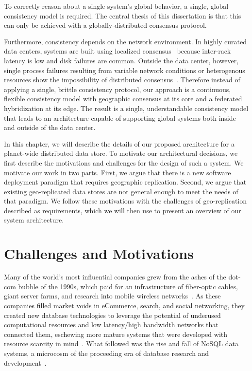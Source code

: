 To correctly reason about a single system's global behavior, a single, global consistency model is required.
The central thesis of this dissertation is that this can only be achieved with a globally-distributed consensus protocol.

Furthermore, consistency depends on the network environment.
In highly curated data centers, systems are built using localized consensus~\cite{bolosky_paxos_2011} because inter-rack latency is low and disk failures are common.
Outside the data center, however, single process failures resulting from variable network conditions or heterogenous resources show the impossibility of distributed consensus~\cite{fischer_impossibility_1985}.
Therefore instead of applying a single, brittle consistency protocol, our approach is a continuous, flexible consistency model with geographic consensus at its core and a federated hybridization at its edge.
The result is a single, understandable consistency model that leads to an architecture capable of supporting global systems both inside and outside of the data center.

In this chapter, we will describe the details of our proposed architecture for a planet-wide distributed data store.
To motivate our architectural decisions, we first describe the motivations and challenges for the design of such a system.
We motivate our work in two parts.
First, we argue that there is a new software deployment paradigm that requires geographic replication.
Second, we argue that existing geo-replicated data stores are not general enough to meet the needs of that paradigm.
We follow these motivations with the challenges of geo-replication described as requirements, which we will then use to present an overview of our system architecture.

\section{Challenges and Motivations}
\label{ch02_challenges_and_motivations}

Many of the world's most influential companies grew from the ashes of the dot-com bubble of the 1990s, which paid for an infrastructure of fiber-optic cables, giant server farms, and research into mobile wireless networks~\cite{casey_blockchain_2018}.
As these companies filled market voids in eCommerce, search, and social networking, they created new database technologies to leverage the potential of underused computational resources and low latency/high bandwidth networks that connected them, eschewing more mature systems that were developed with resource scarcity in mind~\cite{stonebraker_what_2005,stonebraker_mapreduce_2010}.
What followed was the rise and fall of NoSQL data systems, a microcosm of the proceeding era of database research and development~\cite{mohan_history_2013}.

